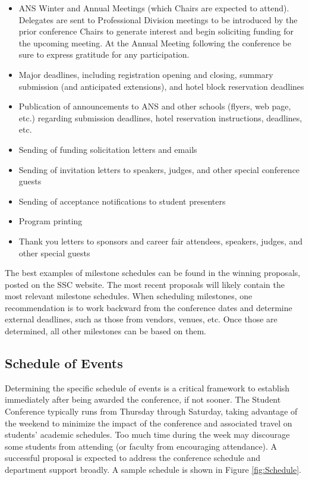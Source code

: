 \documentclass[12pt]{article}
\begin{document}
\begin{itemize}
    \item ANS Winter and Annual Meetings (which Chairs are expected to attend). Delegates are sent to Professional Division meetings to be introduced by the prior conference Chairs to generate interest and begin soliciting funding for the upcoming meeting. At the Annual Meeting following the conference be sure to express gratitude for any participation.
    \item Major deadlines, including registration opening and closing, summary submission (and anticipated extensions), and hotel block reservation deadlines
    \item Publication of announcements to ANS and other schools (flyers, web page, etc.) regarding submission deadlines, hotel reservation instructions, deadlines, etc.
    \item Sending of funding solicitation letters and emails
    \item Sending of invitation letters to speakers, judges, and other special conference guests
    \item Sending of acceptance notifications to student presenters
    \item Program printing
    \item Thank you letters to sponsors and career fair attendees, speakers, judges, and other special guests
\end{itemize}

The best examples of milestone schedules can be found in the winning proposals, posted on the SSC website.
The most recent proposals will likely contain the most relevant milestone schedules.
When scheduling milestones, one recommendation is to work backward from the conference dates and determine external deadlines, such as those from vendors, venues, etc.
Once those are determined, all other milestones can be based on them.

\subsection{Schedule of Events}
Determining the specific schedule of events is a critical framework to establish immediately after being awarded the conference, if not sooner.
The Student Conference typically runs from Thursday through Saturday, taking advantage of the weekend to minimize the impact of the conference and associated travel on students' academic schedules.
Too much time during the week may discourage some students from attending (or faculty from encouraging attendance).
A successful proposal is expected to address the conference schedule and department support broadly.
A sample schedule is shown in Figure \ref{fig:Schedule}.
\end{document}
